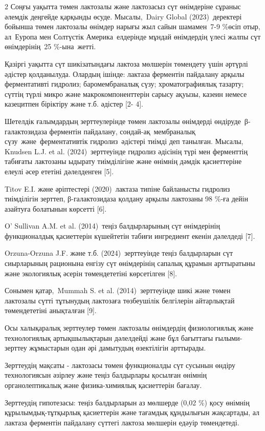 \begin{multicols}{2}
Соңғы уақытта төмен лактозалы және лактозасыз сүт өнімдеріне сұраныс
әлемдік деңгейде қарқынды өсуде. Мысалы,~Dairy Global (2023)~деректері
бойынша төмен лактозалы өнімдер нарығы жыл сайын шамамен~7-9 \%өсіп
отыр, ал~Еуропа мен Солтүстік Америка~елдерінде мұндай өнімдердің үлесі
жалпы сүт өнімдерінің~25 \%-ына~жетті.

Қазіргі уақытта сүт шикізатындағы лактоза мөлшерін төмендету үшін
әртүрлі әдістер қолданылуда. Олардың ішінде: лактаза ферментін пайдалану
арқылы ферментативті гидролиз; баромембраналық сүзу; хроматографиялық
тазарту; сүттің түрлі микро және макрокомпоненттерін сарысу ақуызы,
казеин немесе казецитпен біріктіру және т.б. әдістер {[}2- 4{]}.

Шетелдік ғалымдардың зерттеулерінде төмен лактозалы өнімдерді
өндіруде~β-галактозидаза ферментін пайдалану, сондай-ақ~мембраналық
сүзу~және~ферментативтік гидролиз~әдістері тиімді деп танылған. Мысалы,
Knudsen L.J. et al. (2024)~зерттеуінде гидролиз әдісінің түрі мен
ферменттің табиғаты лактозаны ыдырату тиімділігіне және өнімнің дәмдік
қасиеттеріне елеулі әсер ететіні дәлелденген {[}5{]}.

Titov E.I. және әріптестері (2020)~лактаза типіне байланысты гидролиз
тиімділігін зерттеп, β-галактозидаза қолдану арқылы лактозаны 98 \%-ға
дейін азайтуға болатынын көрсетті {[}6{]}.

O' Sullivan A.M. et al. (2014)~теңіз балдырларының сүт
өнімдерінің функционалдық қасиеттерін күшейтетін табиғи ингредиент
екенін дәлелдеді {[}7{]}.

Orzuna-Orzuna J.F. және т.б. (2024)~зерттеуінде теңіз балдырларын сүт
сиырларының рационына енгізу сүт өнімдерінің сапалық құрамын арттыратыны
және экологиялық әсерін төмендететіні көрсетілген {[}8{]}.

Сонымен қатар,~Mummah S. et al. (2014)~зерттеуінде шикі және төмен
лактозалы сүтті тұтынудың лактозаға төзбеушілік белгілерін айтарлықтай
төмендететіні анықталған {[}9{]}.

Осы халықаралық зерттеулер төмен лактозалы өнімдердің физиологиялық және
технологиялық артықшылықтарын дәлелдейді және бұл бағыттағы
ғылыми-зерттеу жұмыстарын одан әрі дамытудың өзектілігін арттырады.

Зерттеудің мақсаты - лактозасы төмен функционалды сүт сусынын өндіру
технологиясын әзірлеу және теңіз балдырлары қосылған өнімнің
органолептикалық және физика-химиялық қасиеттерін бағалау.

Зерттеудің гипотезасы: теңіз балдырларын аз мөлшерде (0,02 \%) қосу
өнімнің құрылымдық-тұтқырлық қасиеттерін және тағамдық құндылығын
жақсартады, ал лактаза ферментін пайдалану сүттегі лактоза мөлшерін
едәуір төмендетеді.


\end{multicols}
